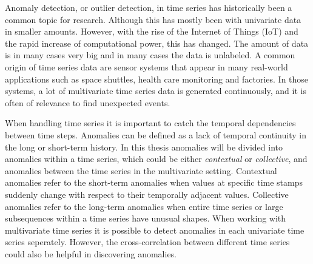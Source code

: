 Anomaly detection, or outlier detection, in time series has historically been a common topic for research. Although this has mostly been with univariate data in smaller amounts. However, with the rise of the Internet of Things (IoT) and the rapid increase of computational power, this has changed. The amount of data is in many cases very big and in many cases the data is unlabeled.   A common origin of time series data are sensor systems that appear in many real-world applications such as space shuttles, health care monitoring and factories. In those systems, a lot of multivariate time series data is generated continuously, and it is often of relevance to find unexpected events. 

When handling time series it is important to catch the temporal dependencies between time steps. Anomalies can be defined as a lack of temporal continuity in the long or short-term history. In this thesis anomalies will be divided into anomalies within a time series, which could be either \textit{contextual} or \textit{collective}, and anomalies between the time series in the multivariate setting. Contextual anomalies refer to the short-term anomalies when values at specific time stamps suddenly change with respect to their temporally adjacent values. Collective anomalies refer to the long-term anomalies when entire time series or large subsequences within a time series have unusual shapes. When working with multivariate time series it is possible to detect anomalies in each univariate time series seperately. However, the cross-correlation between different time series could also be helpful in discovering anomalies. \cite{Aggarwal2013}




